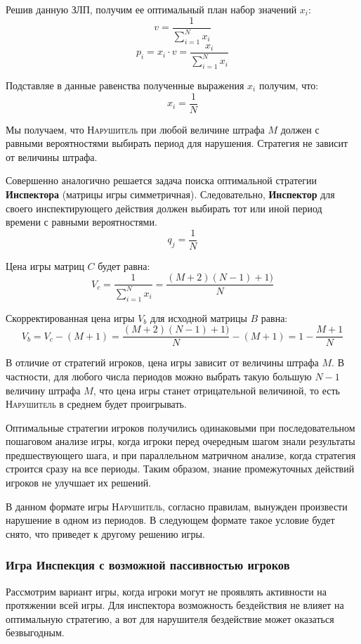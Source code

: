 \documentclass[aps,%
12pt,%
final,%
oneside,
onecolumn,%
musixtex, %
superscriptaddress,%
centertags]{article} %
\theoremstyle{plain}
\theoremstyle{definition}
\theoremstyle{remark}
\begin{document}
Решив данную ЗЛП, получим ее оптимальный план набор значений $x_i$:
$$v = \frac{1}{\sum\limits_{i=1}^N x_i}$$
$$p_i = x_i \cdot v = \frac{x_i}{\sum\limits_{i=1}^N x_i}$$

Подставляе в данные равенства полученные выражения $x_i$ получим, что:
$$x_i = \frac{1}{N}$$

Мы получаем, что \textsc{Нарушитель} при любой величине штрафа $M$ должен с равными вероятностями выбирать период для нарушения. Стратегия не зависит от величины штрафа.

Совершенно аналогично решается задача поиска оптимальной стратегии \textbf{Инспектора} (матрицы игры симметричная). Следовательно, \textbf{Инспектор} для своего инспектирующего действия должен выбирать тот или иной период времени с равными вероятностями.
$$q_j = \frac{1}{N}$$

Цена игры матриц $C$ будет равна:
$$V_c = \frac{1}{\sum\limits_{i=1}^N x_i} = \frac{(M+2)(N-1)+1)}{N}$$

Скорректированная цена игры $V_b$ для исходной матрицы $B$ равна:
$$V_b = V_c -(M+1) = \frac{(M+2)(N-1)+1)}{N} - (M+1) = 1 - \frac{M+1}{N}$$

В отличие от стратегий игроков, цена игры зависит от величины штрафа $M$. В частности, для любого числа периодов можно выбрать такую большую $N-1$ величину штрафа $M$, что цена игры станет отрицательной величиной, то есть \textsc{Нарушитель} в среднем будет проигрывать.

Оптимальные стратегии игроков получились одинаковыми при
последовательном пошаговом анализе игры, когда игроки перед очередным шагом
знали результаты предшествующего шага, и при параллельном матричном анализе,
когда стратегия строится сразу на все периоды. Таким образом, знание
промежуточных действий игроков не улучшает их решений.

В данном формате игры \textsc{Нарушитель}, согласно правилам, вынужден
произвести нарушение в одном из периодов. В следующем формате такое условие
будет снято, что приведет к другому решению игры.

\subsubsection{Игра Инспекция с возможной пассивностью игроков}

Рассмотрим вариант игры, когда игроки могут не проявлять активности на протяжении всей игры. Для инспектора возможность бездействия не влияет на оптимальную стратегию, а вот для нарушителя бездействие может оказаться безвыгодным.
\end{document}
